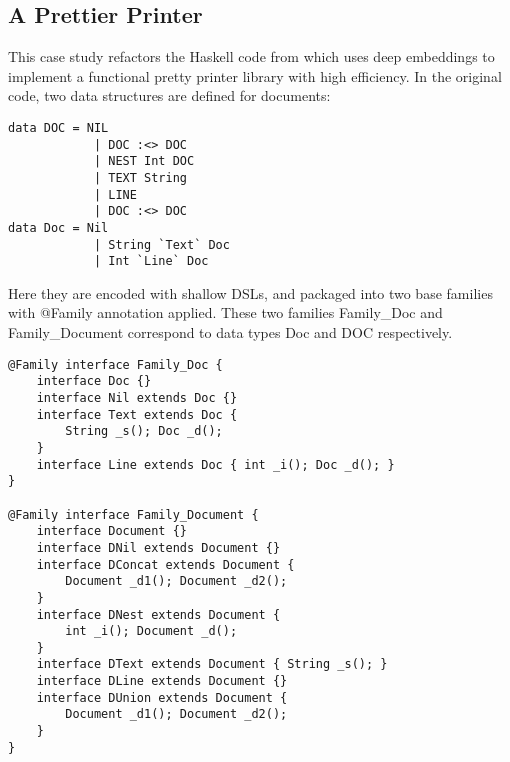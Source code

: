 \subsection{A Prettier Printer}

This case study refactors the Haskell code from \cite{Wadler98aprettier}
which uses deep embeddings to implement a functional pretty printer library with high efficiency. In the original code, two
data structures are defined for documents:
\begin{lstlisting}[keywords={data,Int,String}]
data DOC = NIL
            | DOC :<> DOC
            | NEST Int DOC
            | TEXT String
            | LINE
            | DOC :<> DOC
data Doc = Nil
            | String `Text` Doc
            | Int `Line` Doc
\end{lstlisting}
Here they are encoded with shallow DSLs, and packaged into
two base families with \textsf{@Family} annotation applied. These two families \textsf{Family\_Doc} and
\textsf{Family\_Document} correspond to data types \textsf{Doc} and \textsf{DOC} respectively.

\begin{lstlisting}
@Family interface Family_Doc {
	interface Doc {}
	interface Nil extends Doc {}
	interface Text extends Doc {
		String _s(); Doc _d();
	}
	interface Line extends Doc { int _i(); Doc _d(); }
}

@Family interface Family_Document {
	interface Document {}
	interface DNil extends Document {}
	interface DConcat extends Document {
		Document _d1(); Document _d2();
	}
	interface DNest extends Document {
		int _i(); Document _d();
	}
	interface DText extends Document { String _s(); }
	interface DLine extends Document {}
	interface DUnion extends Document {
		Document _d1(); Document _d2();
	}
}
\end{lstlisting}

